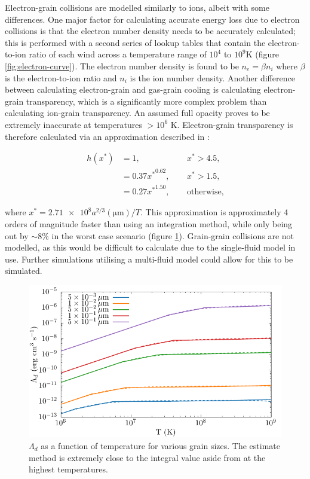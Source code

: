 Electron-grain collisions are modelled similarly to ions, albeit with some differences.
One major factor for calculating accurate energy loss due to electron collisions is that the electron number density needs to be accurately calculated; this is performed with a second series of lookup tables that contain the electron-to-ion ratio of each wind across a temperature range of $10^4$ to $10^9\si{\kelvin}$ (figure \ref{fig:electron-curve}).
The electron number density is found to be $n_e = \beta n_i$ where $\beta$ is the electron-to-ion ratio and $n_i$ is the ion number density.
Another difference between calculating electron-grain and gas-grain cooling is calculating electron-grain transparency, which is a significantly more complex problem than calculating ion-grain transparency.
An assumed full opacity proves to be extremely inaccurate at temperatures $>10^6$ \si{\kelvin}.
Electron-grain transparency is therefore calculated via an approximation described in \textcite{dwek_infrared_1981}:

\begin{equation}
  \begin{alignedat}{3}
    h(x^*) & = 1 ,                && ~~ x^* > 4.5, \\
           & = 0.37{x^*}^{0.62} , && ~~ x^* > 1.5 , \\
           & = 0.27{x^*}^{1.50} , && ~~ \text{otherwise,}
  \end{alignedat}
\end{equation}

\noindent
where $x^* = \num{2.71e8} a^{2/3} (\si{\micro\metre})/T$.
This approximation is approximately 4 orders of magnitude faster than using an integration method, while only being out by $\sim 8\%$ in the worst case scenario (figure \ref{fig:lambdacomparison}).
Grain-grain collisions are not modelled, as this would be difficult to calculate due to the single-fluid model in use.
Further simulations utilising a multi-fluid model could allow for this to be simulated.

\begin{figure}
  \centering
  \includegraphics{assets/grain-transparency/lambda-comp.pdf}
  \caption[Comparison of electron transparency methods.]{$\Lambda_d$ as a function of temperature for various grain sizes. The estimate method is extremely close to the integral value aside from at the highest temperatures.}
  \label{fig:lambdacomparison}
\end{figure}

